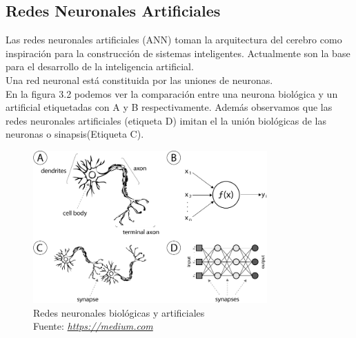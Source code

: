 \subsection{Redes Neuronales Artificiales}
Las redes neuronales artificiales (ANN) toman la arquitectura del cerebro como inspiración para la construcción de sistemas inteligentes. Actualmente son la base para el desarrollo de la inteligencia artificial.\\
Una red neuronal está constituida por las uniones de neuronas.\\
En la figura 3.2 podemos ver la comparación entre una neurona biológica y un artificial etiquetadas con A y B respectivamente. Además observamos que las redes neuronales artificiales (etiqueta D) imitan el la unión biológicas de las neuronas o sinapsis(Etiqueta C).

\begin{figure}[H]
	\centering
	\includegraphics[width=0.8\textwidth]{Figures/ANN.png}
	\caption{Redes neuronales biológicas y artificiales \\ Fuente:  \href{https://medium.com/@ivanliljeqvist/the-essence-of-artificial-neural-networks-5de300c995d6}{\textit{https://medium.com}}}
	\label{neuronas}
\end{figure} 
